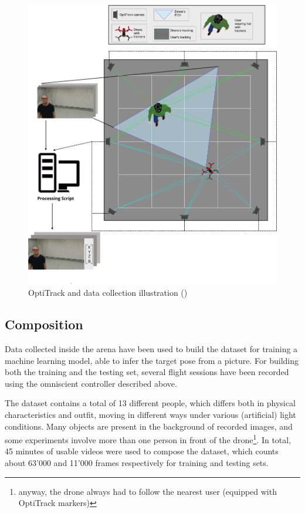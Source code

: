 \begin{figure}[!htb]
	\centering
	\includegraphics[width=1\textwidth]{"contents/images/03-arena-demo-2"}
	\caption[OptiTrack and data collection illustration]{OptiTrack and data collection illustration (\cite{mantegazza2018thesis})}
	\label{fig:drone-demo-2}
\end{figure}



\subsection{Composition}

Data collected inside the arena have been used to build the dataset for training a machine learning model, able to infer the target pose from a picture. For building both the training and the testing set, several flight sessions have been recorded using the omniscient controller described above. 

The dataset contains a total of 13 different people, which differs both in physical characteristics and outfit, moving in different ways under various (artificial) light conditions. Many objects are present in the background of recorded images, and some experiments involve more than one person in front of the drone\footnote{anyway, the drone always had to follow the nearest user (equipped with OptiTrack markers)}. In total, 45 minutes of usable videos were used to compose the dataset, which counts about 63'000 and 11'000 frames respectively for training and testing sets.

